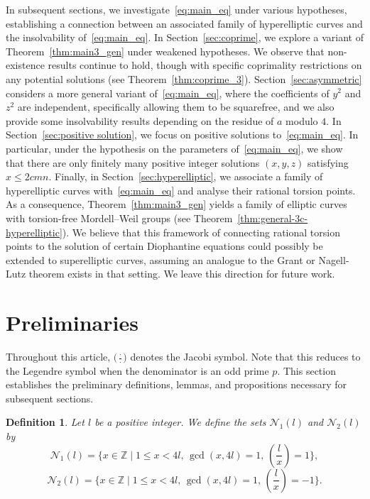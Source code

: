 \documentclass[11pt,a4paper]{amsart}
\newcommand{\ZZ}{\mathbb{Z}}
\theoremstyle{plain}
\newtheorem{defn}[theorem]{Definition}
\theoremstyle{definition}
\begin{document}
In subsequent sections, we investigate~\eqref{eq:main_eq} under various hypotheses, establishing a connection between an associated family of hyperelliptic curves and the insolvability of~\eqref{eq:main_eq}. In Section~\ref{sec:coprime}, we explore a variant of Theorem~\ref{thm:main3_gen} under weakened hypotheses. We observe that non-existence results continue to hold, though with specific coprimality restrictions on any potential solutions (see Theorem~\ref{thm:coprime_3}). Section~\ref{sec:asymmetric} considers a more general variant of~\eqref{eq:main_eq}, where the coefficients of $y^2$ and $z^2$ are independent, specifically allowing them to be squarefree, and we also provide some insolvability results depending on the residue of $a$ modulo $4$. In Section~\ref{sec:positive solution}, we focus on positive solutions to~\eqref{eq:main_eq}. In particular, under the hypothesis on the parameters of~\eqref{eq:main_eq}, we show that there are only finitely many positive integer solutions $(x,y,z)$ satisfying $x \le 2cmn$. Finally, in Section~\ref{sec:hyperelliptic}, we associate a family of hyperelliptic curves with~\eqref{eq:main_eq} and analyse their rational torsion points. As a consequence, Theorem~\ref{thm:main3_gen} yields a family of elliptic curves with torsion-free Mordell--Weil groups (see Theorem~\ref{thm:general-3c-hyperelliptic}). We believe that this framework of connecting rational torsion points to the solution of certain Diophantine equations could possibly be extended to superelliptic curves, assuming an analogue to the Grant or Nagell-Lutz theorem exists in that setting. We leave this direction for future work.

\section{Preliminaries}\label{sec:prelim}
Throughout this article, $\bigl(\frac{\cdot}{\cdot}\bigr)$ denotes the Jacobi symbol. Note that this reduces to the Legendre symbol when the denominator is an odd prime $p$. This section establishes the preliminary definitions, lemmas, and propositions necessary for subsequent sections.
\begin{defn}\label{N_1 definition}
Let $l$ be a positive integer. We define the sets $\mathcal{N}_1(l)$ and $\mathcal{N}_2(l)$ by
\[
  \mathcal{N}_1(l) = \bigg\{ x \in \ZZ \;\bigg|\; 1 \le x < 4l, \, \gcd(x, 4l) = 1, \, \left(\frac{l}{x}\right) = 1 \bigg\},
\]
\[
  \mathcal{N}_2(l) = \bigg\{ x \in \ZZ \;\bigg|\; 1 \le x < 4l, \, \gcd(x, 4l) = 1, \, \left(\frac{l}{x}\right) = -1 \bigg\}.
\]
\end{defn}
\end{document}
